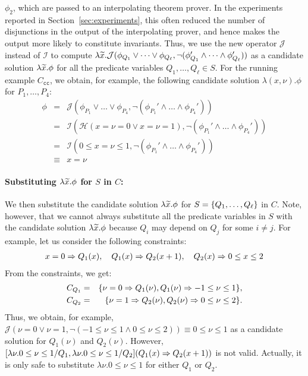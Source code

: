 \(\phi_2\), which are passed to an interpolating theorem prover.
In the experiments reported in Section~\ref{sec:experiments}, this often
reduced the number of disjunctions in the output of the interpolating
prover, and hence makes the output more likely to constitute invariants.
%
Thus, we use the new operator \(\mathcal{J}\) instead of \(\mathcal{I}\) 
to compute \(\lambda \widetilde{x}. \mathcal{J}(\phi_{Q_1} \lor \dots\lor 
\phi_{Q_{\ell}},\neg (\phi_{Q_1}' \land \dots \land\phi_{Q_{\ell}}'))\) 
as a candidate solution \(\lambda \widetilde{x}. \phi\) for all the predicate 
variables \(Q_1,\dots,Q_{\ell} \in S\).  For the running example 
\(C_{\texttt{cc}}\), we obtain, for example, the following candidate 
solution \(\lambda (x, \nu). \phi\) for \(P_1,\dots,P_4\):
\begin{eqnarray*}
\phi&=& \mathcal{J}(\phi_{P_1} \lor \dots \lor \phi_{P_4},\neg (\phi_{P_1}' \land \dots \land \phi_{P_4}')) \\
&=& \mathcal{I}(\mathcal{H}(x=\nu=0 \lor x=\nu=1),\neg (\phi_{P_1}' \land \dots \land \phi_{P_4}')) \\
&=& \mathcal{I}(0 \leq x=\nu \leq 1,\neg (\phi_{P_1}' \land \dots \land \phi_{P_4}')) \\
&\equiv& x=\nu
\end{eqnarray*}

\paragraph{Substituting \(\lambda \widetilde{x}.\phi\) for \(S\) in \(C\):}
We then substitute the candidate solution \(\lambda \widetilde{x}.\phi\) for 
\(S=\{{Q_1,\dots,Q_{\ell}}\}\) in \(C\).  Note, however, that we cannot 
always substitute all the predicate variables in \(S\) with the 
candidate solution \(\lambda\widetilde{x}.\phi\) because \(Q_i\) may depend on 
\(Q_j\) for some \(i \neq j\).  For example, let us consider the 
following constraints:
\begin{eqnarray*}
x=0 \Rightarrow Q_1(x), \quad
Q_1(x) \Rightarrow Q_2(x+1), \quad
Q_2(x) \Rightarrow 0 \leq x \leq 2
\end{eqnarray*}
From the constraints, we get:
\begin{eqnarray*}
C_{Q_1}&=&\{\nu=0 \Rightarrow Q_1(\nu), Q_1(\nu) \Rightarrow -1 \leq \nu\leq 1\}, \\
C_{Q_2}&=&\{\nu=1 \Rightarrow Q_2(\nu), Q_2(\nu) \Rightarrow 0 \leq \nu \leq 2\}.
\end{eqnarray*}
Thus, we obtain, for example, \(\mathcal{J}(\nu=0 \lor \nu=1,\neg (-1 
\leq \nu\leq 1 \land 0 \leq \nu \leq 2)) \equiv 0 \leq \nu \leq 1\) as a 
candidate solution for \(Q_1(\nu)\) and \(Q_2(\nu)\).  However, 
\([\lambda\nu.0 \leq \nu \leq 1/Q_1,\lambda \nu.0 \leq \nu \leq 
1/Q_2](Q_1(x) \Rightarrow Q_2(x+1))\) is not valid.  Actually, it is only 
safe to substitute \(\lambda \nu.0 \leq \nu\leq 1\) for either \(Q_1\) 
or \(Q_2\).

